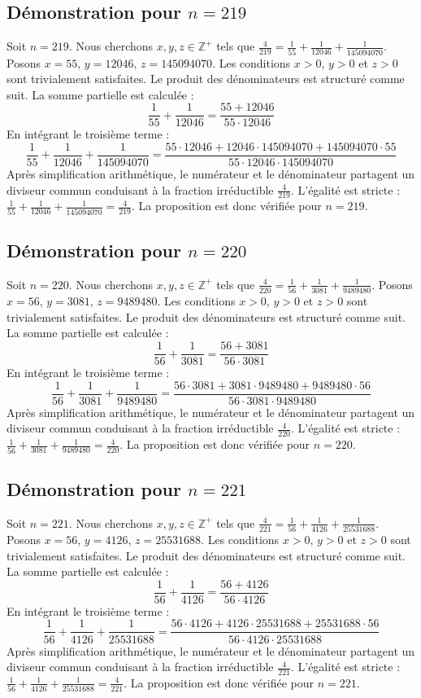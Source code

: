 \documentclass[11pt,a4paper]{article}
\begin{document}
\subsection{Démonstration pour $n = 219$}
Soit $n = 219$. Nous cherchons $x, y, z \in \mathbb{Z}^{+}$ tels que $\frac{4}{219} = \frac{1}{55} + \frac{1}{12046} + \frac{1}{145094070}$.
Posons $x = 55$, $y = 12046$, $z = 145094070$.
Les conditions $x > 0$, $y > 0$ et $z > 0$ sont trivialement satisfaites.
Le produit des dénominateurs est structuré comme suit. La somme partielle est calculée :
$$ \frac{1}{55} + \frac{1}{12046} = \frac{55+12046}{55 \cdot 12046} $$
En intégrant le troisième terme :
$$ \frac{1}{55} + \frac{1}{12046} + \frac{1}{145094070} = \frac{55 \cdot 12046 + 12046 \cdot 145094070 + 145094070 \cdot 55}{55 \cdot 12046 \cdot 145094070} $$
Après simplification arithmétique, le numérateur et le dénominateur partagent un diviseur commun conduisant à la fraction irréductible $\frac{4}{219}$.
L'égalité est stricte : $\frac{1}{55} + \frac{1}{12046} + \frac{1}{145094070} = \frac{4}{219}$.
La proposition est donc vérifiée pour $n = 219$.
\subsection{Démonstration pour $n = 220$}
Soit $n = 220$. Nous cherchons $x, y, z \in \mathbb{Z}^{+}$ tels que $\frac{4}{220} = \frac{1}{56} + \frac{1}{3081} + \frac{1}{9489480}$.
Posons $x = 56$, $y = 3081$, $z = 9489480$.
Les conditions $x > 0$, $y > 0$ et $z > 0$ sont trivialement satisfaites.
Le produit des dénominateurs est structuré comme suit. La somme partielle est calculée :
$$ \frac{1}{56} + \frac{1}{3081} = \frac{56+3081}{56 \cdot 3081} $$
En intégrant le troisième terme :
$$ \frac{1}{56} + \frac{1}{3081} + \frac{1}{9489480} = \frac{56 \cdot 3081 + 3081 \cdot 9489480 + 9489480 \cdot 56}{56 \cdot 3081 \cdot 9489480} $$
Après simplification arithmétique, le numérateur et le dénominateur partagent un diviseur commun conduisant à la fraction irréductible $\frac{4}{220}$.
L'égalité est stricte : $\frac{1}{56} + \frac{1}{3081} + \frac{1}{9489480} = \frac{4}{220}$.
La proposition est donc vérifiée pour $n = 220$.
\subsection{Démonstration pour $n = 221$}
Soit $n = 221$. Nous cherchons $x, y, z \in \mathbb{Z}^{+}$ tels que $\frac{4}{221} = \frac{1}{56} + \frac{1}{4126} + \frac{1}{25531688}$.
Posons $x = 56$, $y = 4126$, $z = 25531688$.
Les conditions $x > 0$, $y > 0$ et $z > 0$ sont trivialement satisfaites.
Le produit des dénominateurs est structuré comme suit. La somme partielle est calculée :
$$ \frac{1}{56} + \frac{1}{4126} = \frac{56+4126}{56 \cdot 4126} $$
En intégrant le troisième terme :
$$ \frac{1}{56} + \frac{1}{4126} + \frac{1}{25531688} = \frac{56 \cdot 4126 + 4126 \cdot 25531688 + 25531688 \cdot 56}{56 \cdot 4126 \cdot 25531688} $$
Après simplification arithmétique, le numérateur et le dénominateur partagent un diviseur commun conduisant à la fraction irréductible $\frac{4}{221}$.
L'égalité est stricte : $\frac{1}{56} + \frac{1}{4126} + \frac{1}{25531688} = \frac{4}{221}$.
La proposition est donc vérifiée pour $n = 221$.
\end{document}
